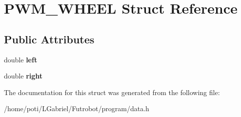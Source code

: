 \hypertarget{structPWM__WHEEL}{}\section{P\+W\+M\+\_\+\+W\+H\+E\+EL Struct Reference}
\label{structPWM__WHEEL}
\subsection*{Public Attributes}
\begin{DoxyCompactItemize}
\item 
double {\bfseries left}\hypertarget{structPWM__WHEEL_a3cb6696b98034a825feaa7586fe644d6}{}\label{structPWM__WHEEL_a3cb6696b98034a825feaa7586fe644d6}

\item 
double {\bfseries right}\hypertarget{structPWM__WHEEL_af97ad82484dd0e1502283117d56ae877}{}\label{structPWM__WHEEL_af97ad82484dd0e1502283117d56ae877}

\end{DoxyCompactItemize}


The documentation for this struct was generated from the following file\+:\begin{DoxyCompactItemize}
\item 
/home/poti/\+L\+Gabriel/\+Futrobot/program/data.\+h\end{DoxyCompactItemize}
